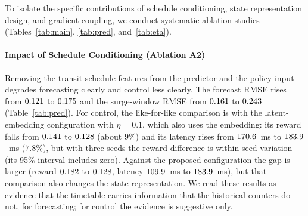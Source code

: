 To isolate the specific contributions of schedule conditioning, state representation design, and gradient coupling, we conduct systematic ablation studies (Tables~\ref{tab:main}, \ref{tab:pred}, and~\ref{tab:eta}).

\paragraph{Impact of Schedule Conditioning (Ablation A2)} 
Removing the transit schedule features from the predictor and the policy input degrades forecasting clearly and control less clearly. The forecast RMSE rises from $0.121$ to $0.175$ and the surge-window RMSE from $0.161$ to $0.243$ (Table~\ref{tab:pred}). For control, the like-for-like comparison is with the latent-embedding configuration with $\eta=0.1$, which also uses the embedding: its reward falls from $0.141$ to $0.128$ (about $9\%$) and its latency rises from $170.6$~ms to $183.9$~ms ($7.8\%$), but with three seeds the reward difference is within seed variation (its 95\% interval includes zero). Against the proposed configuration the gap is larger (reward $0.182$ to $0.128$, latency $109.9$~ms to $183.9$~ms), but that comparison also changes the state representation. We read these results as evidence that the timetable carries information that the historical counters do not, for forecasting; for control the evidence is suggestive only.

